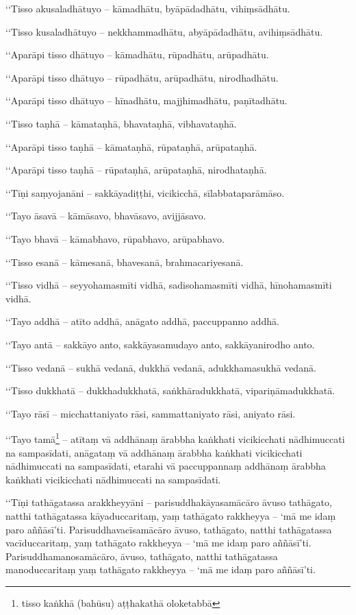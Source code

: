 ‘‘Tisso akusaladhātuyo – kāmadhātu, byāpādadhātu, vihiṃsādhātu.

‘‘Tisso kusaladhātuyo – nekkhammadhātu, abyāpādadhātu, avihiṃsādhātu.

‘‘Aparāpi tisso dhātuyo – kāmadhātu, rūpadhātu, arūpadhātu.

‘‘Aparāpi tisso dhātuyo – rūpadhātu, arūpadhātu, nirodhadhātu.

‘‘Aparāpi tisso dhātuyo – hīnadhātu, majjhimadhātu, paṇītadhātu.

‘‘Tisso taṇhā – kāmataṇhā, bhavataṇhā, vibhavataṇhā.

‘‘Aparāpi tisso taṇhā – kāmataṇhā, rūpataṇhā, arūpataṇhā.

‘‘Aparāpi tisso taṇhā – rūpataṇhā, arūpataṇhā, nirodhataṇhā.

‘‘Tīṇi saṃyojanāni – sakkāyadiṭṭhi, vicikicchā, sīlabbataparāmāso.

‘‘Tayo āsavā – kāmāsavo, bhavāsavo, avijjāsavo.

‘‘Tayo bhavā – kāmabhavo, rūpabhavo, arūpabhavo.

‘‘Tisso esanā – kāmesanā, bhavesanā, brahmacariyesanā.

‘‘Tisso vidhā – seyyohamasmīti vidhā, sadisohamasmīti vidhā, hīnohamasmīti vidhā.

‘‘Tayo addhā – atīto addhā, anāgato addhā, paccuppanno addhā.

‘‘Tayo antā – sakkāyo anto, sakkāyasamudayo anto, sakkāyanirodho anto.

‘‘Tisso vedanā – sukhā vedanā, dukkhā vedanā, adukkhamasukhā vedanā.

‘‘Tisso dukkhatā – dukkhadukkhatā, saṅkhāradukkhatā, vipariṇāmadukkhatā.

‘‘Tayo rāsī – micchattaniyato rāsi, sammattaniyato rāsi, aniyato rāsi.

‘‘Tayo tamā\footnote{tisso kaṅkhā (bahūsu) aṭṭhakathā oloketabbā} – atītaṃ vā addhānaṃ ārabbha kaṅkhati vicikicchati nādhimuccati na sampasīdati, anāgataṃ vā addhānaṃ ārabbha kaṅkhati vicikicchati nādhimuccati na sampasīdati, etarahi vā paccuppannaṃ addhānaṃ ārabbha kaṅkhati vicikicchati nādhimuccati na sampasīdati.

‘‘Tīṇi tathāgatassa arakkheyyāni – parisuddhakāyasamācāro āvuso tathāgato, natthi tathāgatassa kāyaduccaritaṃ, yaṃ tathāgato rakkheyya – ‘mā me idaṃ paro aññāsī’ti. Parisuddhavacīsamācāro āvuso, tathāgato, natthi tathāgatassa vacīduccaritaṃ, yaṃ tathāgato rakkheyya – ‘mā me idaṃ paro aññāsī’ti. Parisuddhamanosamācāro, āvuso, tathāgato, natthi tathāgatassa manoduccaritaṃ yaṃ tathāgato rakkheyya – ‘mā me idaṃ paro aññāsī’ti.

